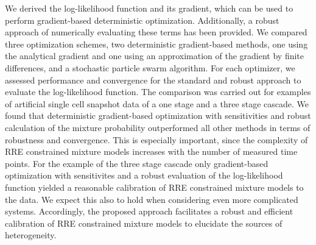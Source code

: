 \documentclass{llncs}
\begin{document}
We derived the log-likelihood function and its gradient, which can be used to perform gradient-based deterministic optimization. Additionally, a robust approach of numerically evaluating these terms has been provided. We compared three optimization schemes, two deterministic gradient-based methods, one using the analytical gradient and one using an approximation of the gradient by finite differences, and a stochastic particle swarm algorithm. For each optimizer, we assessed performance and convergence for the standard and robust approach to evaluate the log-likelihood function. The comparison was carried out for examples of artificial single cell snapshot data of a one stage and a three stage cascade. We found that deterministic gradient-based optimization with sensitivities and robust calculation of the mixture probability outperformed all other methods in terms of robustness and convergence. This is especially important, since the complexity of RRE constrained mixture models increases with the number of measured time points. \color{revcol}For the example of the three stage cascade only gradient-based optimization with sensitivites and a robust evaluation of the log-likelihood function yielded a reasonable calibration of  RRE constrained mixture models to the data. We expect this also to hold when considering even more complicated systems. \color{black}Accordingly, the proposed approach facilitates a robust and efficient calibration of RRE constrained mixture models to elucidate the sources of heterogeneity. 


 
\end{document}
